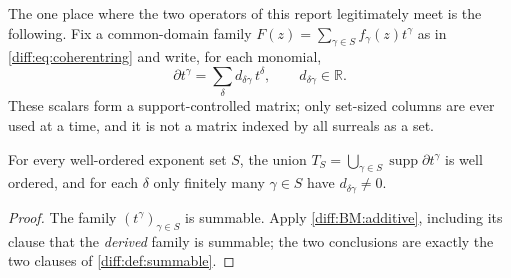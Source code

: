 \documentclass[11pt,letterpaper]{article}
\numberwithin{equation}{section}
\theoremstyle{definition}
\theoremstyle{remark}
\newcommand{\R}{\mathbb R}
\newcommand{\der}{\partial}
\newcommand{\supp}{\operatorname{supp}}
\begin{document}
The one place where the two operators of this report legitimately meet is the
following. Fix a common-domain family
$F(z)=\sum_{\gamma\in S}f_{\gamma}(z)t^{\gamma}$ as in
\cref{diff:eq:coherentring} and write, for each monomial,
\begin{equation}\label{diff:eq:monomialmatrix}
 \der t^{\gamma}=\sum_{\delta}d_{\delta\gamma}\,t^{\delta},
 \qquad d_{\delta\gamma}\in\R .
\end{equation}
These scalars form a support-controlled matrix; only set-sized columns are ever
used at a time, and it is not a matrix indexed by all surreals as a set.

\begin{lemma}
\label{diff:lem:finiteincoming}
For every well-ordered exponent set $S$, the union
$T_{S}=\bigcup_{\gamma\in S}\supp\der t^{\gamma}$ is well ordered, and for
each $\delta$ only finitely many $\gamma\in S$ have
$d_{\delta\gamma}\neq0$.
\end{lemma}
\begin{proof}
The family $(t^{\gamma})_{\gamma\in S}$ is summable. Apply
\ref{diff:BM:additive}, including its clause that the \emph{derived} family is
summable; the two conclusions are exactly the two clauses of
\cref{diff:def:summable}.
\end{proof}
\end{document}
